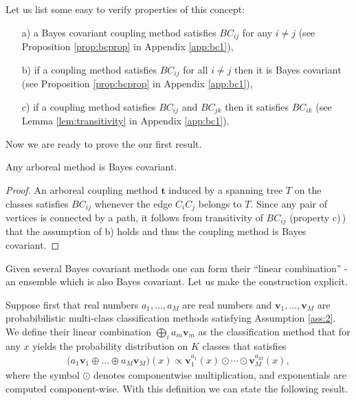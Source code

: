 Let us list some easy to verify properties of this concept:

\begin{itemize}
	\item[a)] a Bayes covariant coupling method satisfies $BC_{ij}$ for any $i\not= j$ (see Proposition \ref{prop:bcprop} in Appendix \ref{app:bc1}),
	\item[b)] if a coupling method satisfies $BC_{ij}$ for all $i\not= j$ then it is Bayes covariant (see Proposition \ref{prop:bcprop} in Appendix \ref{app:bc1}),
	\item[c)] if a coupling method satisfies $BC_{ij}$ and $BC_{jk}$ then it satisfies $BC_{ik}$ (see Lemma \ref{lem:transitivity} in Appendix \ref{app:bc1}).
\end{itemize}

Now we are ready to prove the our first result.

\begin{prop}
Any arboreal method is Bayes covariant.
\end{prop}
\begin{proof}

An arboreal coupling method $\boldsymbol{t}$ induced by a spanning tree $T$ on the classes satisfies $BC_{ij}$ whenever the edge $C_iC_j$ belongs to $T$. Since any pair of vertices is connected by a path, it follows from transitivity of $BC_{ij}$ (property c)\,) that the assumption of b) holds and thus the coupling method is Bayes covariant.
	
\end{proof}

Given several Bayes covariant methods one can form  their ``linear combination'' - an ensemble which is also Bayes covariant. Let us make the construction explicit.

Suppose first that real numbers $a_1, \ldots,a_M$ are real numbers and $\boldsymbol{v}_1, \ldots, \boldsymbol{v}_M$ are probabibilistic multi-class classification methods satisfying Assumption \ref{ass:2}. We define their linear combination $\bigoplus_i a_m \boldsymbol{v}_m$ as the classification method that for any $x$ yields the probability distribution on $K$ classes that satisfies
\begin{align*}
 	\bigl(a_1 \boldsymbol{v}_1 \oplus \ldots \oplus a_M \boldsymbol{v}_M\bigr)(x) \propto \boldsymbol{v}_1^{a_1}(x) \odot \cdots \odot \boldsymbol{v}_M^{a_M}(x),
\end{align*}
where the symbol $\odot$ denotes componentwise multiplication, and exponentials are computed component-wise. With this definition we can state the following result.

